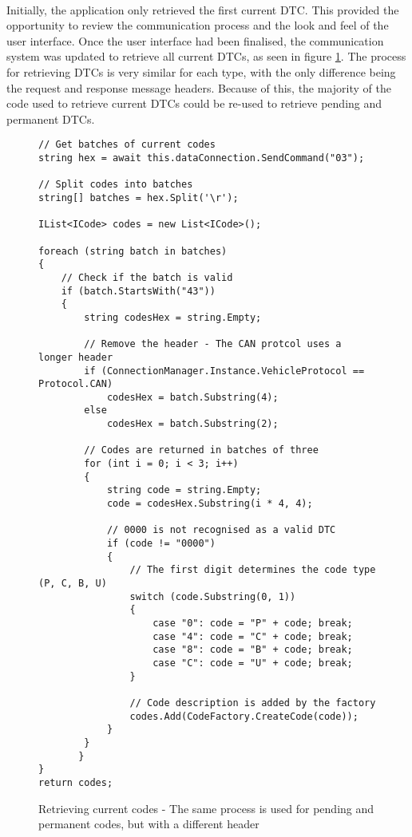 	\paragraph{}{
	Initially, the application only retrieved the first current DTC. This provided the opportunity to review the communication process and the look and feel of the user interface. Once the user interface had been finalised, the communication system was updated to retrieve all current DTCs, as seen in figure \ref{code:DTCModuleCodes}. The process for retrieving DTCs is very similar for each type, with the only difference being the request and response message headers. Because of this, the majority of the code used to retrieve current DTCs could be re-used to retrieve pending and permanent DTCs.
	}
	
	\begin{figure}[h]
		\begin{lstlisting}
// Get batches of current codes
string hex = await this.dataConnection.SendCommand("03");

// Split codes into batches
string[] batches = hex.Split('\r');

IList<ICode> codes = new List<ICode>();

foreach (string batch in batches)
{
	// Check if the batch is valid
    if (batch.StartsWith("43"))
    {        
        string codesHex = string.Empty;
        		
		// Remove the header - The CAN protcol uses a longer header
		if (ConnectionManager.Instance.VehicleProtocol == Protocol.CAN)
			codesHex = batch.Substring(4);
        else
			codesHex = batch.Substring(2);

        // Codes are returned in batches of three
		for (int i = 0; i < 3; i++)
		{
			string code = string.Empty;
			code = codesHex.Substring(i * 4, 4);

			// 0000 is not recognised as a valid DTC
			if (code != "0000")
			{
				// The first digit determines the code type (P, C, B, U)
				switch (code.Substring(0, 1))
				{
					case "0": code = "P" + code; break;
					case "4": code = "C" + code; break;
					case "8": code = "B" + code; break;
					case "C": code = "U" + code; break;						
				}					
				
				// Code description is added by the factory
				codes.Add(CodeFactory.CreateCode(code));
			}
		}
       }
}
return codes;
		\end{lstlisting}
		\caption{Retrieving current codes - The same process is used for pending and permanent codes, but with a different header}
		\label{code:DTCModuleCodes}
	\end{figure}
			
